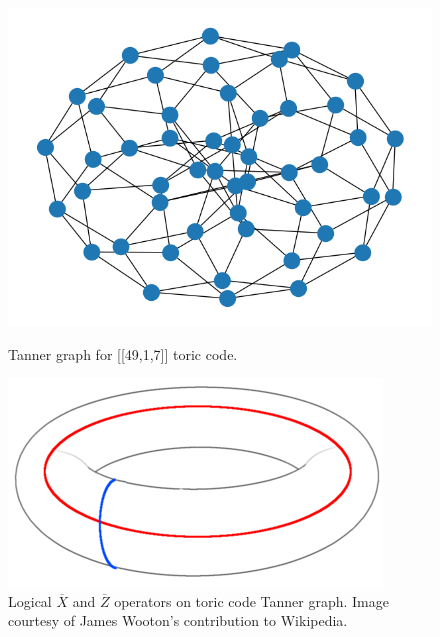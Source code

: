 \begin{figure}[htbp]
    \centering
    \begin{minipage}[t]{0.48\textwidth}
      \centering
      \includegraphics[width=\linewidth]{./img/figures/toric_5_graph.png}
      \caption{Tanner graph for [[49,1,7]] toric code.}
      \label{fig: toric_graph}
    \end{minipage}
    \hfill
    \begin{minipage}[t]{0.48\textwidth}
      \centering
      \includegraphics[width=\linewidth]{./img/figures/toriclogicals.png}
      \caption{Logical $\overline{X}$ and $\overline{Z}$ operators on toric code 
      Tanner graph. Image courtesy of James Wooton's contribution to Wikipedia.}
      \label{fig: toric logicals}
    \end{minipage}
  \end{figure}

\newpage